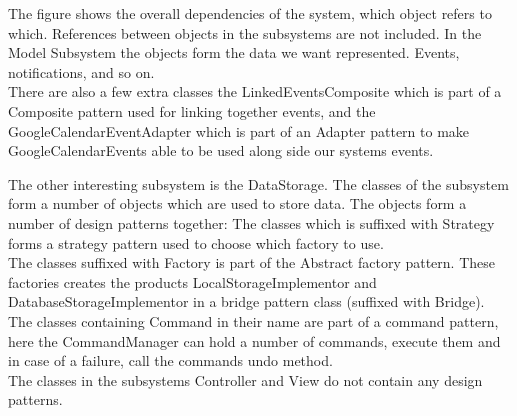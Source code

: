 The figure shows the overall dependencies of the system, which object refers to which. References between objects in the subsystems are not included. In the Model Subsystem the objects form the data we want represented. Events, notifications, and so on. \\There are also a few extra classes the LinkedEventsComposite which is part of a Composite pattern used for linking together events, and the GoogleCalendarEventAdapter which is part of an Adapter pattern to make GoogleCalendarEvents able to be used along side our systems events.

The other interesting subsystem is the DataStorage. The classes of the subsystem form a number of objects which are used to store data. The objects form a number of design patterns together: The classes which is suffixed with Strategy forms a strategy pattern used to choose which factory to use. \\The classes suffixed with Factory is part of the Abstract factory pattern. These factories creates the products LocalStorageImplementor and DatabaseStorageImplementor in a bridge pattern class (suffixed with Bridge). \\The classes containing Command in their name are part of a command pattern, here the CommandManager can hold a number of commands, execute them and in case of a failure, call the commands undo method.\\

The classes in the subsystems Controller and View do not contain any design patterns.